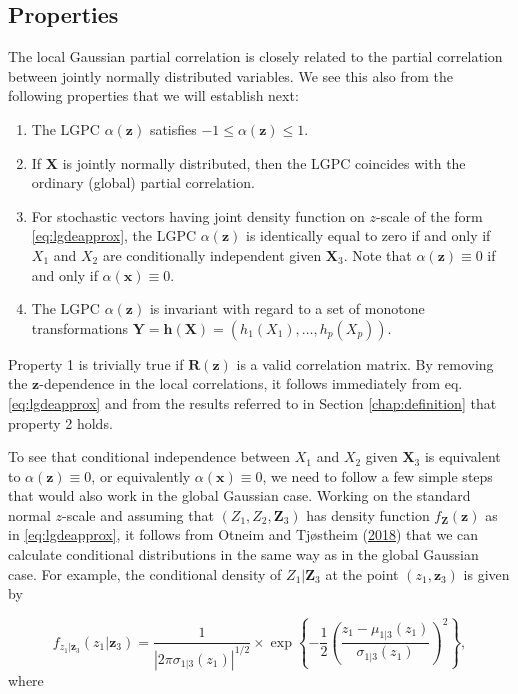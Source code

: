 \documentclass[
  12pt,
  letterpaper]{article}
\providecommand{\tightlist}{%
  \setlength{\itemsep}{0pt}\setlength{\parskip}{0pt}}
\newcommand{\X}{\bm{X}}
\newcommand{\x}{\bm{x}}
\newcommand{\Z}{\bm{Z}}
\newcommand{\z}{\bm{z}}
\newcommand{\Y}{\bm{Y}}
\newcommand{\R}{\bm{R}}
\theoremstyle{definition}
\theoremstyle{definition}
\theoremstyle{definition}
\theoremstyle{remark}
\begin{document}
\hypertarget{properties}{%
\subsection{Properties}\label{properties}}

The local Gaussian partial correlation is closely related to the partial correlation between jointly normally distributed variables. We see this also from the following properties that we will establish next:

\begin{enumerate}
\def\labelenumi{\arabic{enumi}.}
\tightlist
\item
  The LGPC \(\alpha(\z)\) satisfies \(-1 \leq \alpha(\z) \leq 1\).
\item
  If \(\X\) is jointly normally distributed, then the LGPC coincides with the ordinary (global) partial correlation.
\item
  For stochastic vectors having joint density function on \(z\)-scale of the form \eqref{eq:lgdeapprox}, the LGPC \(\alpha(\z)\) is identically equal to zero if and only if \(X_1\) and \(X_2\) are conditionally independent given \(\X_3\). Note that \(\alpha(\z) \equiv 0\) if and only if \(\alpha(\x) \equiv 0\). \label{prop:char}
\item
  The LGPC \(\alpha(\z)\) is invariant with regard to a set of monotone transformations \(\Y = \bm{h}(\X) = (h_1(X_1), \ldots, h_p(X_p))\).
\end{enumerate}

Property 1 is trivially true if \(\R(\z)\) is a valid correlation matrix. By removing the \(\z\)-dependence in the local correlations, it follows immediately from eq. \eqref{eq:lgdeapprox} and from the results referred to in Section \ref{chap:definition} that property 2 holds.

To see that conditional independence between \(X_1\) and \(X_2\) given \(\X_3\) is equivalent to \(\alpha(\z) \equiv 0\), or equivalently \(\alpha(\x) \equiv 0\), we need to follow a few simple steps that would also work in the global Gaussian case. Working on the standard normal \(z\)-scale and assuming that \((Z_1, Z_2, \Z_3)\) has density function \(f_{\Z}(\z)\) as in \eqref{eq:lgdeapprox}, it follows from Otneim and Tjøstheim (\protect\hyperlink{ref-otneim2017conditional}{2018}) that we can calculate conditional distributions in the same way as in the global Gaussian case. For example, the conditional density of \(Z_1|\Z_3\) at the point \((z_1, \z_3)\) is given by

\[f_{z_1|\z_3}(z_1|\z_3) = \frac{1}{|2\pi\sigma_{1|3}(z_1)|^{1/2}}\times\exp \left\{-\frac{1}{2}\left(\frac{z_1 - \mu_{1|3}(z_1)}{\sigma_{1|3}(z_1)}\right)^2\right\},\]
where
\end{document}
